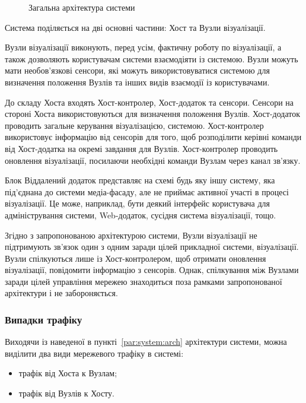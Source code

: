 \documentclass[a4paper,ukrainian,utf8,nocolumnsxix,floatsection]{eskdtext}
\renewcommand\paragraph{\subsubsection}
\begin{document}
\begin{figure}[bth]
\centering
{}
\caption{\label{fig:sys_arch}Загальна архітектура системи}
\end{figure}

Система поділяється на дві основні частини: Хост та Вузли візуалізації.

Вузли візуалізації виконують, перед усім, фактичну роботу по візуалізації, а також дозволяють користувачам системи взаємодіяти із системою. Вузли можуть мати необов’язкові сенсори, які можуть використовуватися системою для визначення положення Вузлів та інших видів взаємодії із користувачами.

До складу Хоста входять Хост-контролер, Хост-додаток та сенсори. Сенсори на стороні Хоста використовуються для визначення положення Вузлів. Хост-додаток проводить загальне керування візуалізацією, системою. Хост-контролер використовує інформацію від сенсорів для того, щоб розподілити керівні команди від Хост-додатка на окремі завдання для Вузлів. Хост-контролер проводить оновлення візуалізації, посилаючи необхідні команди Вузлам через канал зв’язку.

Блок Віддалений додаток представляє на схемі будь яку іншу систему, яка під’єднана до системи медіа-фасаду, але не приймає активної участі в процесі візуалізації. Це може, наприклад, бути деякий інтерфейс користувача для адміністрування системи, Web-додаток, сусідня система візуалізації, тощо.

Згідно з запропонованою архітектурою системи, Вузли візуалізації не підтримують зв’язок один з одним заради цілей прикладної системи, візуалізації. Вузли спілкуються лише із Хост-контролером, щоб отримати оновлення візуалізації, повідомити інформацію з сенсорів. Однак, спілкування між Вузлами заради цілей управління мережею знаходиться поза рамками запропонованої архітектури і не забороняється.

\paragraph{Випадки трафіку}
\label{par:traffic:cases}

Виходячи із наведеної в пункті~\ref{par:system:arch} архітектури системи, можна виділити два види мережевого трафіку в системі:
\begin{itemize}
	\item трафік від Хоста к Вузлам;
	\item трафік від Вузлів к Хосту.
\end{itemize}
\end{document}
